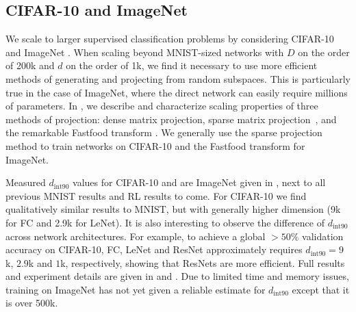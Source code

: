 \documentclass{article} %
\newcommand{\dintn}{d_{\mathrm{int90}}}
\begin{document}
\subsection{CIFAR-10 and ImageNet}

We scale to larger supervised classification problems by considering CIFAR-10 \citep{krizhevsky2009learning} and ImageNet \citep{russakovsky2015imagenet}. When scaling beyond MNIST-sized networks with $D$ on the order of 200k and $d$ on the order of 1k, we find it necessary to use more efficient methods of generating and projecting from random subspaces. This is particularly true in the case of ImageNet, where the direct network can easily require millions of parameters.
In , we describe and characterize scaling properties of three methods of projection: dense matrix projection, sparse matrix projection~\citep{li2006verysparse}, and the remarkable Fastfood transform \citep{le2013fastfood}. We generally use the sparse projection method to train networks on CIFAR-10 and the Fastfood transform for ImageNet.

Measured $\dintn$ values for CIFAR-10 and are ImageNet given in , next to all previous MNIST results and RL results to come. For CIFAR-10 we find qualitatively similar results to MNIST, but with generally higher dimension (9k  for FC and 2.9k  for LeNet). It is also interesting to observe the difference of $\dintn$ across network architectures. For example, to achieve a global $>\!\!50\%$ validation accuracy on CIFAR-10, FC, LeNet and ResNet approximately requires $\dintn=9$k, $2.9$k and $1$k, respectively, showing that ResNets are more efficient.
Full results and experiment details are given in  and .
%
Due to limited time and memory issues, training on ImageNet has not yet given a reliable estimate for $\dintn$ except that it is over 500k.


\end{document}
